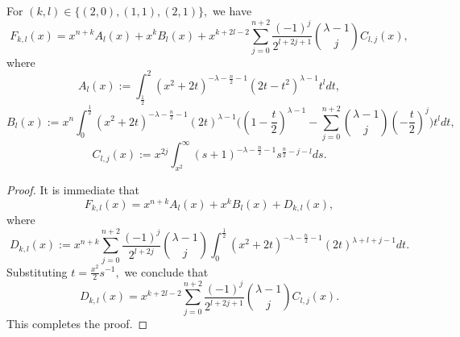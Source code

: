 \documentclass[12pt]{amsart}
\begin{document}
\begin{lemma}\label{second fkl lemma} For $(k,l)\in\{(2,0),(1,1),(2,1)\},$ we have
$$F_{k,l}(x)=x^{n+k}A_l(x)+x^kB_l(x)+x^{k+2l-2}\sum_{j=0}^{n+2}\frac{(-1)^j}{2^{l+2j+1}}\binom{\lambda-1}{j}C_{l,j}(x),$$
where
$$A_l(x):=\int_{\frac12}^2(x^2+2t)^{-\lambda-\frac{n}{2}-1}(2t-t^2)^{\lambda-1}t^ldt,$$
$$B_l(x):=x^n\int_0^{\frac12}(x^2+2t)^{-\lambda-\frac{n}{2}-1}(2t)^{\lambda-1}\Big((1-\frac{t}{2})^{\lambda-1}-\sum_{j=0}^{n+2}\binom{\lambda-1}{j}(-\frac{t}{2})^j\Big)t^ldt,$$
$$C_{l,j}(x):=x^{2j}\int_{x^2}^{\infty}(s+1)^{-\lambda-\frac{n}{2}-1}s^{\frac{n}{2}-j-l}ds.$$
\end{lemma}
\begin{proof} It is immediate that
$$F_{k,l}(x)=x^{n+k}A_l(x)+x^kB_l(x)+D_{k,l}(x),$$
where
$$D_{k,l}(x):=x^{n+k}\sum_{j=0}^{n+2}\frac{(-1)^j}{2^{l+2j}}\binom{\lambda-1}{j}\int_0^{\frac12}(x^2+2t)^{-\lambda-\frac{n}{2}-1}(2t)^{\lambda+l+j-1}dt.$$
Substituting $t=\frac{x^2}{2}s^{-1},$ we conclude that
$$D_{k,l}(x)=x^{k+2l-2}\sum_{j=0}^{n+2}\frac{(-1)^j}{2^{l+2j+1}}\binom{\lambda-1}{j}C_{l,j}(x).$$
This completes the proof.
\end{proof}
\end{document}
